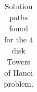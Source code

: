 \begin{table}[h]
\begin{tabular}{|l|l|l|l|}
\end{tabular}
\caption{Solution paths found for the 4 disk Towers of Hanoi problem.}
\end{table}